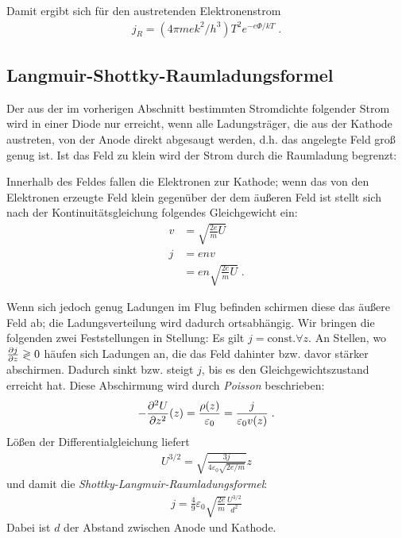   Damit ergibt sich für den austretenden Elektronenstrom
  \begin{align}\label{equ:richardson}
    j_R = (4\pi m e k^2/h^3) T^2 e^{-e\Phi/{kT}}\;.
  \end{align}



\subsection{Langmuir-Shottky-Raumladungsformel}
\label{sub:shottky_langmuir_strom}
  Der aus der im vorherigen Abschnitt bestimmten Stromdichte folgender Strom wird in einer Diode nur erreicht, wenn alle Ladungsträger, die aus der Kathode austreten, von der Anode direkt abgesaugt werden, d.h. das angelegte Feld groß genug ist. Ist das Feld zu klein wird der Strom durch die Raumladung begrenzt:
  \par
  Innerhalb des Feldes fallen die Elektronen zur Kathode; wenn das von den Elektronen erzeugte Feld klein gegenüber der dem äußeren Feld ist stellt sich nach der Kontinuitätsgleichung folgendes Gleichgewicht ein:
  \begin{align}\label{equ:}
     v &= \sqrt{\frac{2 e}{m} U} \\
     j &= e n v\\
       &= e n \sqrt{\frac{2 e}{m} U} \;.
   \end{align}
   \par

   Wenn sich jedoch genug Ladungen im Flug befinden schirmen diese das äußere Feld ab; die Ladungsverteilung wird dadurch ortsabhängig. Wir bringen die folgenden zwei Feststellungen in Stellung:
   Es gilt $j=\text{const.} \forall z$. An Stellen, wo $\frac{\mathrm{\partial}j}{\mathrm{\partial}z}\gtrless 0$ häufen sich Ladungen an, die das Feld dahinter bzw. davor stärker abschirmen. Dadurch sinkt bzw. steigt $j$, bis es den Gleichgewichtszustand erreicht hat.
   Diese Abschirmung wird durch \emph{Poisson} beschrieben:
   \begin{align}\label{equ:poisson}
     - \frac{\mathrm{\partial}^2 U}{\mathrm{\partial}z^2}(z) = \frac{\rho(z)}{\varepsilon_0} = \frac{j}{\varepsilon_0 v(z)}\;.
   \end{align}
   Lößen der Differentialgleichung liefert
   \begin{align}\label{equ:raumladung}
     U^{3/2} = \sqrt{\frac{3 j}{4 \varepsilon_0 \sqrt{2 e/m}}} z
   \end{align}
   und damit die \emph{Shottky-Langmuir-Raumladungsformel}:
   \begin{align}\label{equ:shottky-langumir}
     j = \frac{4}{9}\varepsilon_0 \sqrt{\frac{2 e}{m}} \frac{U^{3/2}}{d^2}
   \end{align}
   Dabei ist $d$ der Abstand zwischen Anode und Kathode.



